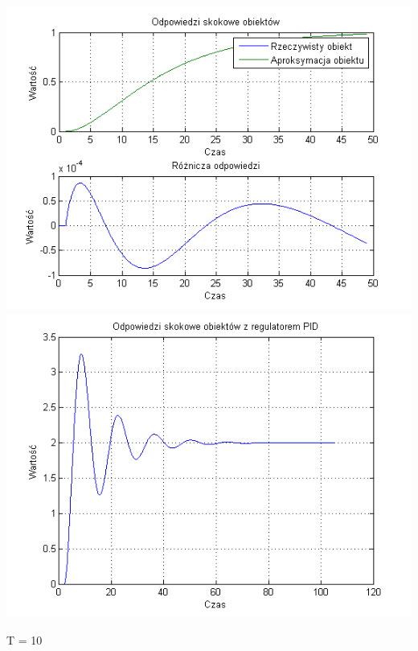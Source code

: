 \documentclass[10pt,a4paper]{article}
\begin{document}
\begin{center}
\includegraphics[scale=1]{images/dwa/skrypt_71.png}\\
\includegraphics[scale=1]{images/dwa/skrypt_72.png}\\
\end{center}
\newpage
T = 10
\end{document}
